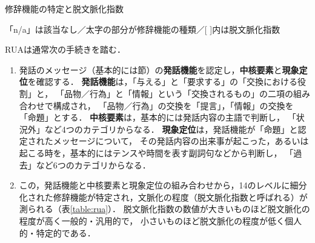 \documentclass[japanese]{jnlp_1.4}
\begin{document}
\begin{table}[b]
\caption{修辞機能の特定と脱文脈化指数}
\label{table:rua}

\vspace{0.5zw}\small
「n/a」は該当なし／太字の部分が修辞機能の種類／[ ]内は脱文脈化指数\par
\end{table}

RUAは通常次の手続きを踏む．
\begin{enumerate}
\item 発話のメッセージ（基本的には節）の{\bf 発話機能}を認定し，{\bf 中核要素}と{\bf 現象定位}を確認する．
{\bf 発話機能}は，「与える」と「要求する」の「交換における役割」と，
「品物／行為」と「情報」という「交換されるもの」の二項の組み合わせで構成され，
「品物／行為」の交換を「提言」，「情報」の交換を「命題」とする\cite{Book_Halliday}．
{\bf 中核要素}は，基本的には発話内容の主語で判断し，
「状況外」など4つのカテゴリからなる．
{\bf 現象定位}は，発話機能が「命題」と認定されたメッセージについて，
その発話内容の出来事が起こった，あるいは起こる時を，基本的にはテンスや時間を表す副詞句などから判断し，
「過去」など6つのカテゴリからなる．
\item この，発話機能と中核要素と現象定位の組み合わせから，14のレベルに細分
化された修辞機能が特定され，文脈化の程度（脱文脈化指数と呼ばれる）が測られる（表\ref{table:rua}）．
脱文脈化指数の数値が大きいものほど脱文脈化の程度が高く一般的・汎用的で，
小さいものほど脱文脈化の程度が低く個人的・特定的である．
\end{enumerate}
\end{document}

